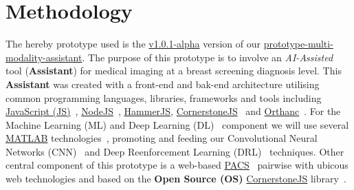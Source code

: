 
\section{Methodology}
\label{sec:sec003}

The hereby prototype used is the \hyperlink{https://github.com/mida-project/prototype-multi-modality-assistant/releases/tag/v1.0.1-alpha}{v1.0.1-alpha} version of our \hyperlink{https://github.com/mida-project/prototype-multi-modality-assistant/}{prototype-multi-modality-assistant}. The purpose of this prototype is to involve an \textit{AI-Assisted} tool (\textbf{Assistant}) for medical imaging at a breast screening diagnosis level. This \textbf{Assistant} was created with a front-end and bak-end architecture utilising common programming languages, libraries, frameworks and tools including \hyperlink{https://www.javascript.com/}{JavaScript (JS)}~\cite{flanagan2006javascript}, \hyperlink{https://nodejs.org/}{NodeJS}~\cite{wilson2018node}, \hyperlink{https://hammerjs.github.io/}{HammerJS}, \hyperlink{https://cornerstonejs.org/}{CornerstoneJS}~\cite{hostetter2018integration} and \hyperlink{https://www.orthanc-server.com/}{Orthanc}~\cite{Jodogne:ISBI2013}. For the Machine Learning (ML) and Deep Learning (DL)~\cite{ribeiro2017real, ribeiro2016real} component we will use several \hyperlink{https://www.mathworks.com/products/matlab.html}{MATLAB} technologies~\cite{vedaldi2015matconvnet}, promoting and feeding our Convolutional Neural Networks (CNN)~\cite{carneiro2015unregistered} and Deep Reenforcement Learning (DRL)~\cite{maicas2017deep} techniques. Other central component of this prototype is a web-based \hyperlink{https://www.sciencedirect.com/topics/medicine-and-dentistry/picture-archiving-and-communication-system}{PACS}~\cite{cooke2003picture} pairwise with ubicous web technologies and based on the \textbf{Open Source (OS)} \hyperlink{https://cornerstonejs.org/}{CornerstoneJS} library~\cite{feller2002understanding, hostetter2018integration}.


